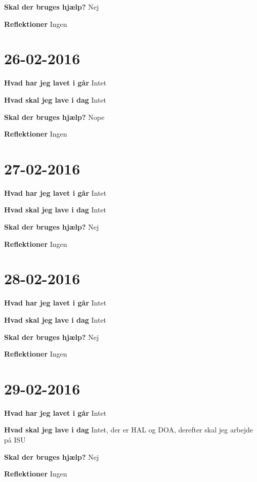 \documentclass{article}
\begin{document}
	\textbf{Skal der bruges hjælp?} Nej
	
	\textbf{Reflektioner} Ingen
	
	\section{26-02-2016}
	
	\textbf{Hvad har jeg lavet i går} Intet
	
	\textbf{Hvad skal jeg lave i dag} Intet
	
	\textbf{Skal der bruges hjælp?} Nope
	
	\textbf{Reflektioner} Ingen
	
	\section{27-02-2016}
	
	\textbf{Hvad har jeg lavet i går} Intet
	
	\textbf{Hvad skal jeg lave i dag} Intet
	
	\textbf{Skal der bruges hjælp?} Nej
	
	\textbf{Reflektioner} Ingen
	
	\section{28-02-2016}
	
	\textbf{Hvad har jeg lavet i går} Intet
	
	\textbf{Hvad skal jeg lave i dag} Intet
	
	\textbf{Skal der bruges hjælp?} Nej
	
	\textbf{Reflektioner} Ingen
	
	\section{29-02-2016}
	
	\textbf{Hvad har jeg lavet i går} Intet
	
	\textbf{Hvad skal jeg lave i dag} Intet, der er HAL og DOA, derefter skal jeg arbejde på ISU
	
	\textbf{Skal der bruges hjælp?} Nej
	
	\textbf{Reflektioner} Ingen
	
	
\end{document}
